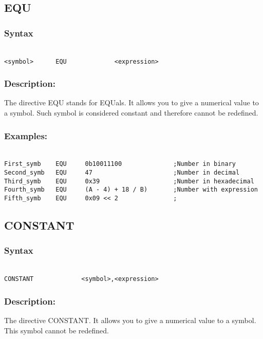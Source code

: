     \subsection{EQU}
        \subsubsection{Syntax}
        {
            ~\\
            \usecodefont
            \verb'<symbol>      EQU             <expression> '
        }
        \subsubsection{Description:}
                The directive EQU stands for EQUals. It allows you to give a numerical value to a symbol. Such symbol is considered constant and therefore cannot be redefined.

        \subsubsection{Examples:}
        {
            ~\\
            \usecodefont
            \verb'First_symb    EQU     0b10011100              ;Number in binary'\\
            \verb'Second_symb   EQU     47                      ;Number in decimal'\\
            \verb'Third_symb    EQU     0x39                    ;Number in hexadecimal'\\
            \verb'Fourth_symb   EQU     (A - 4) + 18 / B)       ;Number with expression'\\
            \verb'Fifth_symb    EQU     0x09 << 2               ;'\\
        }

    \subsection{CONSTANT}
        \subsubsection{Syntax}
        {
            ~\\
            \usecodefont
            \verb'CONSTANT             <symbol>,<expression>'
        }
        \subsubsection{Description:}
                The directive CONSTANT. It allows you to give a numerical value to a symbol. This symbol cannot be redefined.

